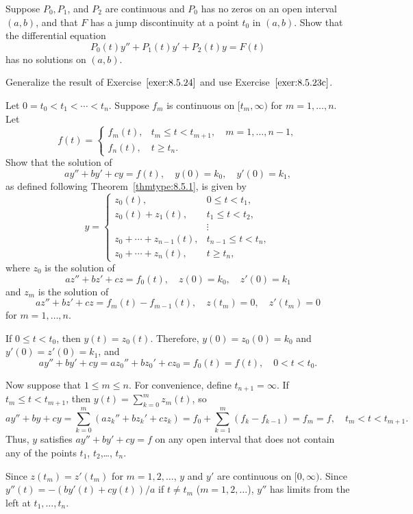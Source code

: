 \documentclass{ximera}
\begin{document}
\begin{problem}\label{exer:8.5.25}
Suppose $P_0,P_1$, and $P_2$ are continuous and $P_0$
has no zeros on an open interval $(a,b)$, and  that $F$
has a jump discontinuity at a point $t_0$ in $(a,b)$.
Show that the differential equation
$$
P_0(t)y''+P_1(t)y'+P_2(t)y=F(t)
$$
has no solutions on $(a,b)$.

\begin{hint}
Generalize the result of
Exercise~$\ref{exer:8.5.24}$ and use Exercise~$\ref{exer:8.5.23c}$.
\end{hint}
\end{problem}

\begin{problem}\label{exer:8.5.26}
Let $0=t_0<t_1<\cdots <t_n$. Suppose $f_m$ is continuous
on $[t_m,\infty)$ for $m=1,\dots,n$.
 Let
$$
f(t)=
\left\{\begin{array}{cl}
f_m(t),&t_m\le t< t_{m+1},\quad m=1,\dots,n-1,\\
f_n(t),&t\ge t_n.
\end{array}\right.
$$
Show that the
solution of
$$
ay''+by'+cy=f(t), \quad  y(0)=k_0,\quad y'(0)=k_1,
$$
as defined following  Theorem~\ref{thmtype:8.5.1}, is given by
$$
y=\left\{\begin{array}{cl}
 z_0(t),&0\le t<t_1,\\ 
z_0(t)+ z_1(t),&t_1\le t<t_2,\\
&\vdots\\
z_0+\cdots+z_{n-1}(t),&t_{n-1}\le t<t_n,\\ 
z_0+\cdots+ z_n(t),&t\ge t_n,
\end{array}\right.
$$
where $z_0$ is the solution of
$$
az''+bz'+cz=f_0(t), \quad  z(0)=k_0,\quad  z'(0)=k_1
$$
and $z_m$ is the solution of
$$
az''+bz'+cz=f_m(t)-f_{m-1}(t), \quad  z(t_m)=0,\quad z'(t_m)=0
$$
for $m=1,\dots,n$.

\begin{solution}
If $0\le t<t_0$, then $y(t)=z_0(t)$. Therefore,
$y(0)=z_0(0)=k_0$ and $y'(0)=z'(0)=k_1$, and
$$
ay''+by'+cy=az_0''+bz_0'+cz_0=f_0(t)=f(t),\quad 0<t<t_0.
$$

Now suppose that $1\le m\le n$.
For convenience, define $t_{n+1}=\infty$.
If $t_m\le t<t_{m+1}$, then $y(t)=\sum_{k=0}^m z_m(t)$, so
$$
ay''+by+cy=\sum_{k=0}^m(az_k''+bz_k'+cz_k)
=f_0+\sum_{k=1}^m(f_k-f_{k-1})=f_m=f,\quad t_m<t<t_{m+1}.
$$
Thus, $y$ satisfies $ay''+by'+cy=f$ on any open interval that does not
contain any of the points $t_1$, $t_2$,\dots, $t_n$.

Since $z(t_m)=z'(t_m)$ for $m=1,2,\dots$, $y$ and $y'$
are continuous on $[0,\infty)$. Since
$y''(t)=-(by'(t)+cy(t))/a$ if $t\ne t_m$ ($m=1,2,\dots$),
$y''$ has limits from the left at  $t_1,\dots,t_n$.
\end{solution}
\end{problem}
\end{document}

